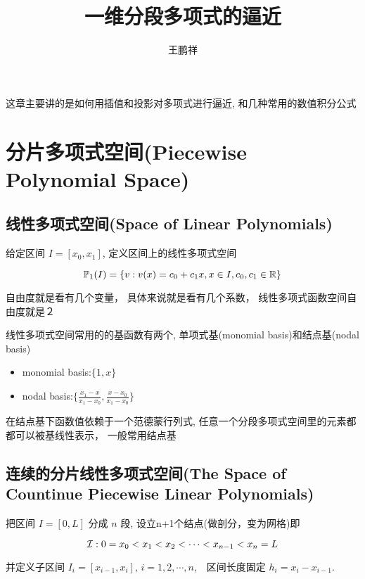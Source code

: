 \documentclass{article}
\begin{document}
\title{一维分段多项式的逼近}
\author{王鹏祥}
\date{\chntoday}
\maketitle
\tableofcontents
\newpage

这章主要讲的是如何用插值和投影对多项式进行逼近, 和几种常用的数值积分公式
\section{分片多项式空间(Piecewise Polynomial Space)}

\subsection{线性多项式空间(Space of Linear Polynomials)}

给定区间 $I = [x_0, x_1]$, 定义区间上的线性多项式空间

\begin{equation}\label{1}
    {\mathbb P}_1(I) = \{v: v(x) = c_0 + c_1x, x \in I, c_0, c_1 \in {\mathbb R}\}
\end{equation}

自由度就是看有几个变量， 具体来说就是看有几个系数， 线性多项式函数空间自由度就是２

线性多项式空间常用的的基函数有两个, 单项式基(monomial basis)和结点基(nodal basis)
\begin{itemize}
	\item monomial basis:$ \{ 1,x \}$
	\item nodal basis:$ \{ \frac{x_1 - x}{x_1 - x_0} , \frac{x - x_0}{x_1 - x_0} \}$
\end{itemize}
在结点基下函数值依赖于一个范德蒙行列式, 任意一个分段多项式空间里的元素都都可以被基线性表示， 一般常用结点基

\subsection{连续的分片线性多项式空间(The Space of Countinue Piecewise Linear Polynomials)}

把区间 $I = [0, L]$ 分成 $n$ 段, 设立n+1个结点(做剖分，变为网格)即

\begin{equation*}
    {\mathcal I}: 0 = x_0 < x_1 < x_2 < \cdots < x_{n-1} < x_n = L
\end{equation*}

并定义子区间 $I_i = [x_{i-1}, x_i], \, i = 1, 2, \cdots, n$,　区间长度固定 
$h_i = x_i - x_{i-1}$.
\end{document}
